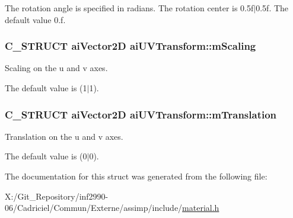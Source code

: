The rotation angle is specified in radians. The rotation center is 0.\-5f$\vert$0.5f. The default value 0.\-f. \hypertarget{structai_u_v_transform_a89429a027cbf914e7212e48149a957c8}{
\subsubsection[{m\-Scaling}]{\setlength{\rightskip}{0pt plus 5cm}C\-\_\-\-S\-T\-R\-U\-C\-T {\bf ai\-Vector2\-D} ai\-U\-V\-Transform\-::m\-Scaling}}\label{structai_u_v_transform_a89429a027cbf914e7212e48149a957c8}
Scaling on the u and v axes.

The default value is (1$\vert$1). \hypertarget{structai_u_v_transform_a8c7f35959aa342bf0cef670246fbb813}{
\subsubsection[{m\-Translation}]{\setlength{\rightskip}{0pt plus 5cm}C\-\_\-\-S\-T\-R\-U\-C\-T {\bf ai\-Vector2\-D} ai\-U\-V\-Transform\-::m\-Translation}}\label{structai_u_v_transform_a8c7f35959aa342bf0cef670246fbb813}
Translation on the u and v axes.

The default value is (0$\vert$0). 

The documentation for this struct was generated from the following file\-:\begin{DoxyCompactItemize}
\item 
X\-:/\-Git\-\_\-\-Repository/inf2990-\/06/\-Cadriciel/\-Commun/\-Externe/assimp/include/\hyperlink{material_8h}{material.\-h}\end{DoxyCompactItemize}
